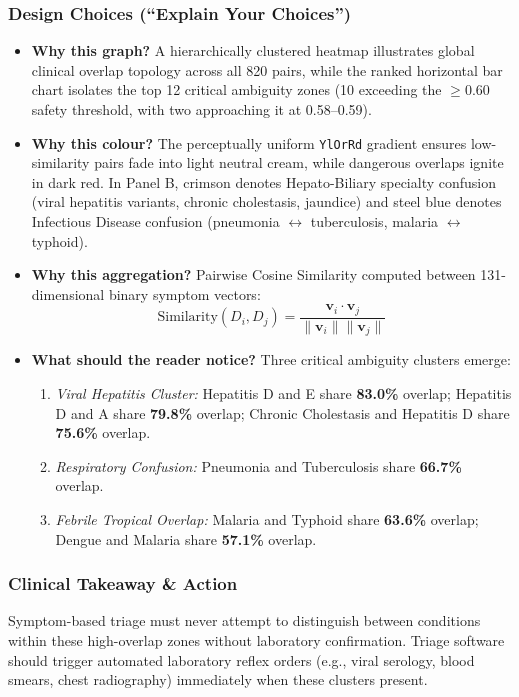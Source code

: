 \documentclass[conference]{IEEEtran}
\begin{document}
\subsubsection{Design Choices (``Explain Your Choices'')}
\begin{itemize}[noitemsep]
    \item \textbf{Why this graph?} A hierarchically clustered heatmap illustrates global clinical overlap topology across all 820 pairs, while the ranked horizontal bar chart isolates the top 12 critical ambiguity zones (10 exceeding the $\ge 0.60$ safety threshold, with two approaching it at 0.58--0.59).
    \item \textbf{Why this colour?} The perceptually uniform \texttt{YlOrRd} gradient ensures low-similarity pairs fade into light neutral cream, while dangerous overlaps ignite in dark red. In Panel B, crimson denotes Hepato-Biliary specialty confusion (viral hepatitis variants, chronic cholestasis, jaundice) and steel blue denotes Infectious Disease confusion (pneumonia $\leftrightarrow$ tuberculosis, malaria $\leftrightarrow$ typhoid).
    \item \textbf{Why this aggregation?} Pairwise Cosine Similarity computed between 131-dimensional binary symptom vectors:
    \begin{equation}
        \text{Similarity}(D_i, D_j) = \frac{\mathbf{v}_i \cdot \mathbf{v}_j}{\|\mathbf{v}_i\| \|\mathbf{v}_j\|}
    \end{equation}
    \item \textbf{What should the reader notice?} Three critical ambiguity clusters emerge:
    \begin{enumerate}[noitemsep]
        \item \textit{Viral Hepatitis Cluster:} Hepatitis D and E share \textbf{83.0\%} overlap; Hepatitis D and A share \textbf{79.8\%} overlap; Chronic Cholestasis and Hepatitis D share \textbf{75.6\%} overlap.
        \item \textit{Respiratory Confusion:} Pneumonia and Tuberculosis share \textbf{66.7\%} overlap.
        \item \textit{Febrile Tropical Overlap:} Malaria and Typhoid share \textbf{63.6\%} overlap; Dengue and Malaria share \textbf{57.1\%} overlap.
    \end{enumerate}
\end{itemize}

\subsubsection{Clinical Takeaway \& Action}
Symptom-based triage must never attempt to distinguish between conditions within these high-overlap zones without laboratory confirmation. Triage software should trigger automated laboratory reflex orders (e.g., viral serology, blood smears, chest radiography) immediately when these clusters present.
\end{document}
